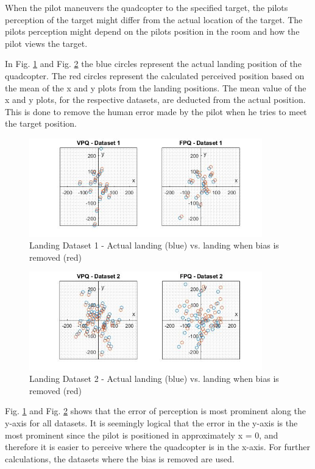 When the pilot maneuvers the quadcopter to the specified target, the pilots perception of the target might differ from the actual location of the target. The pilots perception might depend on the pilots position in the room and how the pilot views the target.\bigskip

In Fig. \ref{fig:landsetup2} and Fig. \ref{fig:landsetup3} the blue circles represent the actual landing position of the quadcopter. The red circles represent the calculated perceived position based on the mean of the x and y plots from the landing positions. The mean value of the x and y plots, for the respective datasets, are deducted from the actual position. This is done to remove the human error made by the pilot when he tries to meet the target position. 

\begin{figure}[H]
    \centering
    \includegraphics[width = 0.9\textwidth]{VAPIQ-PICTURES/actualvsbiased1}
    \caption{Landing Dataset 1 - Actual landing (blue) vs. landing when bias is removed (red)}
    \label{fig:landsetup2}
\end{figure}

\begin{figure}[H]
    \centering
    \includegraphics[width = 0.9\textwidth]{VAPIQ-PICTURES/actualvsbiased2}
    \caption{Landing Dataset 2 - Actual landing (blue) vs. landing when bias is removed (red)}
    \label{fig:landsetup3}
\end{figure}

Fig. \ref{fig:landsetup2} and Fig. \ref{fig:landsetup3} shows that the error of perception is most prominent along the y-axis for all datasets. It is seemingly logical that the error in the y-axis is the most prominent since the pilot is positioned in approximately x = 0, and therefore it is easier to perceive where the quadcopter is in the x-axis. For further calculations, the datasets where the bias is removed are used.\bigskip

